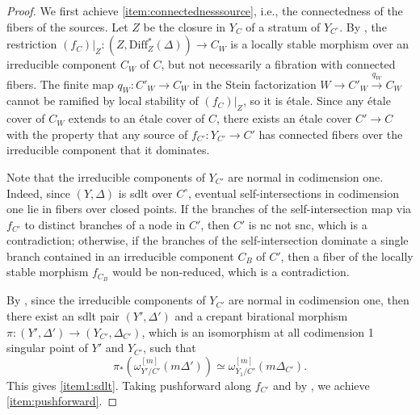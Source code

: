 \documentclass{amsart}
\theoremstyle{definition}
\theoremstyle{remark}
\numberwithin{equation}{section}
\begin{document}
\begin{proof}
We first achieve \eqref{item:connectednesssource}, i.e., the connectedness of the fibers of the sources. Let $Z$ be the closure in $Y_{C}$ of a stratum of $Y_{C^{\circ}}$.
By \cite[Lem.~2.11]{kbook}, the restriction $(f_{C})|_Z \colon (Z, \mathrm{Diff}^*_{Z}(\Delta)) \to C_{W}$ is a locally stable morphism over an irreducible component $C_W$ of $C$, but not necessarily a fibration with connected fibers. The finite map $q_{W} \colon C'_{W} \to C_W$ in the Stein factorization $W \to C'_{W} \xrightarrow{q_W} C_W$ cannot be ramified by local stability of $(f_{C})|_Z$, so it is \'{e}tale. Since any \'{e}tale cover of $C_W$ extends to an \'{e}tale cover of $C$, there exists an \'{e}tale cover $C' \to C$ with the property that any source of $f_{C'} \colon Y_{C'} \to C'$ has connected fibers over the irreducible component that it dominates.

Note that the irreducible components of $Y_{C'}$ are normal in codimension one. Indeed, since $(Y, \Delta)$ is sdlt over $C^{\circ}$, eventual self-intersections in codimension one lie in fibers over closed points. If the branches of the self-intersection map via $f_{C'}$ to distinct branches of a node in $C'$, then $C'$ is nc not snc, which is a contradiction; otherwise, if the branches of the self-intersection dominate a single branch contained in an irreducible component $C_B$ of $C'$, then a fiber of the locally stable morphism $f_{C_B}$ would be non-reduced, which is a contradiction.

By \cite{Hashizume2021}, since the irreducible components of $Y_{C'}$ are normal in codimension one, 
then there exist an sdlt pair $(Y', \Delta')$ and a crepant birational morphism $\pi \colon (Y', \Delta') \to (Y_{C'}, \Delta_{C'})$, which is an isomorphism at all codimension 1 singular point of $Y'$ and $Y_{C'}$, such that 
\begin{equation}
\pi_* (\omega^{[m]}_{Y'/C'}(m\Delta')) \simeq \omega^{[m]}_{Y_1/C'}(m\Delta_{C'}).
\end{equation}
This gives \eqref{item1:sdlt}. Taking pushforward along $f_{C'}$ and by \cite[(2.67.2)]{kbook}, we achieve \eqref{item:pushforward}.
\end{proof}
\end{document}
